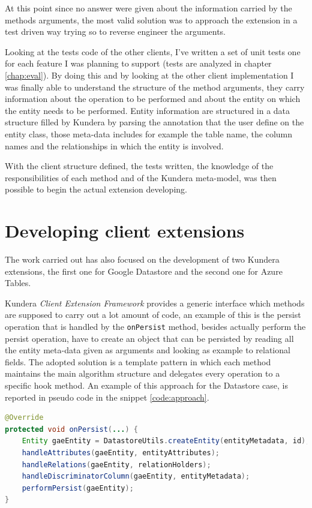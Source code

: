 \newparagraph At this point since no answer were given about the information carried by the methods arguments, the most valid solution was to approach the extension in a test driven way trying so to reverse engineer the arguments.

\noindent Looking at the tests code of the other clients, I've written a set of unit tests one for each feature I was planning to support (tests are analyzed in chapter \ref{chap:eval}).
By doing this and by looking at the other client implementation I was finally able to understand the structure of the method arguments, they carry information about the operation to be performed and about the entity on which the entity needs to be performed.
Entity information are structured in a data structure filled by Kundera by parsing the annotation that the user define on the entity class, those meta-data includes for example the table name, the column names and the relationships in which the entity is involved.

\noindent With the client structure defined, the tests written, the knowledge of the responsibilities of each method and of the Kundera meta-model, was then possible to begin the actual extension developing.

\section{Developing client extensions}
\label{sec:develop}
The work carried out has also focused on the development of two Kundera extensions, the first one for Google Datastore and the second one for Azure Tables.

\noindent Kundera \textit{Client Extension Framework} provides a generic interface which methods are supposed to carry out a lot amount of code, an example of this is the persist operation that is handled by the \texttt{onPersist} method, besides actually perform the persist operation, have to create an object that can be persisted by reading all the entity meta-data given as arguments and looking as example to relational fields.
\noindent The adopted solution is a template pattern in which each method maintains the main algorithm structure and delegates every operation to a specific hook method.
An example of this approach for the Datastore case, is reported in pseudo code in the snippet \ref{code:approach}.

\begin{lstlisting}[language=Java, caption=Template for the persist operation, label=code:approach]
@Override
protected void onPersist(...) {
    Entity gaeEntity = DatastoreUtils.createEntity(entityMetadata, id);
    handleAttributes(gaeEntity, entityAttributes);
    handleRelations(gaeEntity, relationHolders);
    handleDiscriminatorColumn(gaeEntity, entityMetadata);
    performPersist(gaeEntity);
}
\end{lstlisting}


